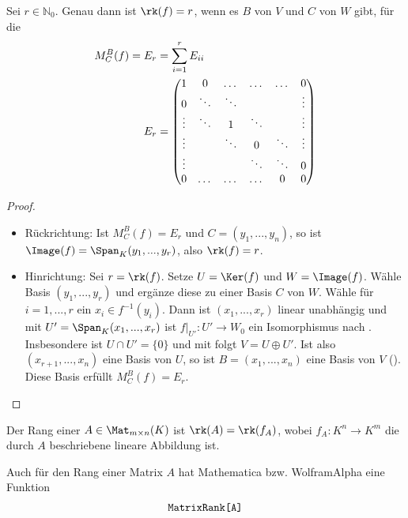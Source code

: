 \begin{proposition}
	Sei $r\in \mathbb N_0$. Genau dann ist $\rk(f)=r$, wenn es $B$ von $V$ und $C$ von $W$ gibt, für die 
	\begin{align}
		M_C^B(f)=E_r&=\sum_{i=1}^r E_{ii}\notag \\ 
		E_r&=\begin{pmatrix}
		1 & 0 & \dots & \dots & \dots & 0 \\
		0 & \ddots & \ddots & \; & \; & \vdots \\
		\vdots & \ddots & 1 & \ddots & \; & \vdots\\
		\vdots & \; & \ddots & 0 & \ddots & \vdots\\
		\vdots & \; & \; & \ddots & \ddots & 0\\
		0 & \dots & \dots & \dots & 0 & 0\\
		\end{pmatrix}\notag
	\end{align}
\end{proposition}
\begin{proof}
	\begin{itemize}
		\item Rückrichtung: Ist $M_C^B(f)=E_r$ und $C=(y_1,...,y_n)$, so ist $\Image(f)=\Span_K(y_1,...,y_r)$, also $\rk(f)=r$.
		\item Hinrichtung: Sei $r=\rk(f)$. Setze $U=\Ker(f)$ und $W=\Image(f)$. Wähle Basis $(y_1,...,y_r)$ und ergänze diese zu einer Basis $C$ von 
		$W$. Wähle für $i=1,...,r$ ein $x_i\in f^{-1}(y_i)$. Dann ist $(x_1,...,x_r)$ linear unabhängig und mit $U'=\Span_K(x_1,...,x_r)$ ist
		$f|_{U'}:U'\to W_0$ ein Isomorphismus nach . Insbesondere ist $U\cap U'=\{0\}$ und mit  folgt $V=U\oplus U'$. Ist also $(x_{r+1},...,x_n)$ 
		eine Basis von $U$, so ist $B=(x_1,...,x_n)$ eine Basis von $V$ (). Diese Basis erfüllt $M_C^B(f)=E_r$.
	\end{itemize}
\end{proof}

\begin{definition}
	Der Rang einer  $A\in \Mat_{m\times n}(K)$ ist $\rk(A)=\rk(f_A)$, wobei $f_A:K^n\to K^m$ 
	die durch $A$ beschriebene lineare Abbildung ist.
\end{definition}

\begin{mathematica}
	Auch für den Rang einer Matrix $A$ hat Mathematica bzw. WolframAlpha eine Funktion
	\begin{align}
		\texttt{MatrixRank[A]}\notag
	\end{align}
\end{mathematica}

